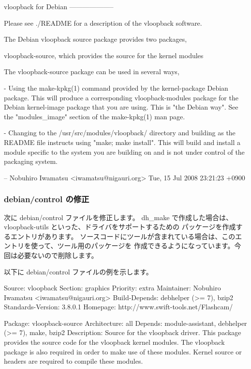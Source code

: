 \documentclass[mingoth,a4paper]{jsarticle}
\begin{document}
\begin{commandline}
vloopback for Debian
--------------------

Please see ./README for a description of the vloopback software.

The Debian vloopback source package provides two packages,

 vloopback-source, which provides the source for the kernel modules

The vloopback-source package can be used in several ways,

 - Using the make-kpkg(1) command provided by the kernel-package Debian
   package. This will produce a corresponding vloopback-modules package for
   the Debian kernel-image package that you are using. This is "the Debian
   way". See the "modules_image" section of the make-kpkg(1) man page.

 - Changing to the /usr/src/modules/vloopback/ directory and building as
   the README file instructs using "make; make install". This will build
   and install a module specific to the system you are building on and is
   not under control of the packaging system.

 -- Nobuhiro Iwamatsu <iwamatsu@nigauri.org>  Tue, 15 Jul 2008 23:21:23 +0900
\end{commandline}


\subsubsection{debian/control の修正}
次に debian/control ファイルを修正します。
dh\_make で作成した場合は、vloopback-utils といった、ドライバをサポートするための
パッケージを作成するエントリがあります。
ソースコードにツールが含まれている場合は、このエントリを使って、ツール用のパッケージを
作成できるようになっています。今回は必要ないので削除します。

以下に debian/control ファイルの例を示します。
\begin{commandline}
Source: vloopback
Section: graphics
Priority: extra
Maintainer: Nobuhiro Iwamatsu <iwamatsu@nigauri.org>
Build-Depends: debhelper (>= 7), bzip2
Standards-Version: 3.8.0.1
Homepage: http://www.swift-tools.net/Flashcam/

Package: vloopback-source
Architecture: all
Depends: module-assistant, debhelper (>= 7), make, bzip2
Description: Source for the vloopback driver.
 This package provides the source code for the vloopback kernel modules.
 The vloopback package is also required in order to make use of these
 modules. Kernel source or headers are required to compile these modules.
\end{commandline}
\end{document}
